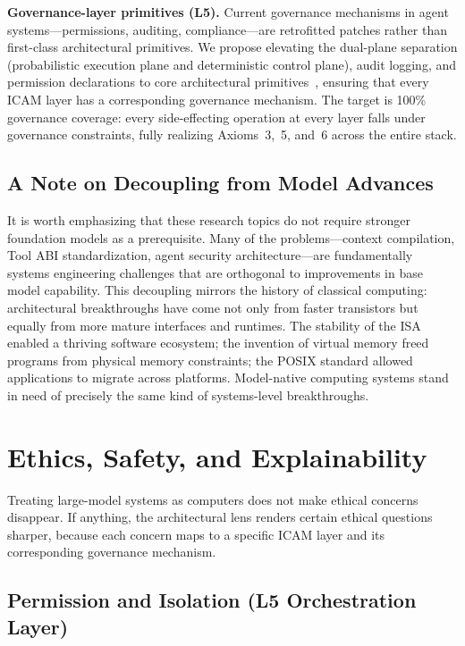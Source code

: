 \documentclass[11pt,a4paper]{article}
\begin{document}
\textbf{Governance-layer primitives (L5).}
Current governance mechanisms in agent systems---permissions, auditing, compliance---are retrofitted patches rather than first-class architectural primitives.
We propose elevating the dual-plane separation (probabilistic execution plane and deterministic control plane), audit logging, and permission declarations to core architectural primitives~\cite{arbiteros2025,ironclaw2025}, ensuring that every ICAM layer has a corresponding governance mechanism.
The target is 100\% governance coverage: every side-effecting operation at every layer falls under governance constraints, fully realizing Axioms~3,~5, and~6 across the entire stack.

\subsection{A Note on Decoupling from Model Advances}

It is worth emphasizing that these research topics do not require stronger foundation models as a prerequisite.
Many of the problems---context compilation, Tool ABI standardization, agent security architecture---are fundamentally systems engineering challenges that are orthogonal to improvements in base model capability.
This decoupling mirrors the history of classical computing: architectural breakthroughs have come not only from faster transistors but equally from more mature interfaces and runtimes.
The stability of the ISA enabled a thriving software ecosystem; the invention of virtual memory freed programs from physical memory constraints; the POSIX standard allowed applications to migrate across platforms.
Model-native computing systems stand in need of precisely the same kind of systems-level breakthroughs.




\section{Ethics, Safety, and Explainability}
\label{sec:ethics}

Treating large-model systems as computers does not make ethical concerns disappear. If anything, the architectural lens renders certain ethical questions sharper, because each concern maps to a specific ICAM layer and its corresponding governance mechanism.

\subsection{Permission and Isolation (L5 Orchestration Layer)}
\label{sec:ethics-permission}
\end{document}
